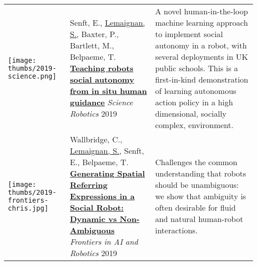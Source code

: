 \begin{tabular}{p{1.7cm}p{7cm}p{8cm}}
%
%

    \vspace{-0.2cm}\texttt{[image: thumbs/2019-science.png]} & Senft, E.,
    \ul{Lemaignan, S.}, Baxter, P., Bartlett, M., Belpaeme, T.
    \newline\href{https://doi.org/10.1126/scirobotics.aat1186}{\textbf{Teaching robots
    social autonomy from in situ human guidance}}
    \newline \textit{Science Robotics} 2019
    & \small A novel human-in-the-loop machine learning approach
    to implement social autonomy in a robot, with several deployments in UK
    public schools. This is a first-in-kind demonstration of learning autonomous
    action policy in a high dimensional, socially complex,
    environment.\textbf{} \\


    \vspace{-.20cm}\texttt{[image: thumbs/2019-frontiers-chris.jpg]} &

    Wallbridge, C., \ul{Lemaignan, S.}, Senft, E., Belpaeme, T.  
    \newline\href{https://doi.org/10.3389/frobt.2019.00067}{\textbf{Generating
    Spatial Referring Expressions in a Social Robot: Dynamic vs Non-Ambiguous}}
    \newline \textit{Frontiers in AI and Robotics} 2019
    & \small Challenges the common understanding that robots should be
    unambiguous: we show that ambiguity is often desirable for fluid and natural
    human-robot interactions.\textbf{}  \\


\end{tabular}
